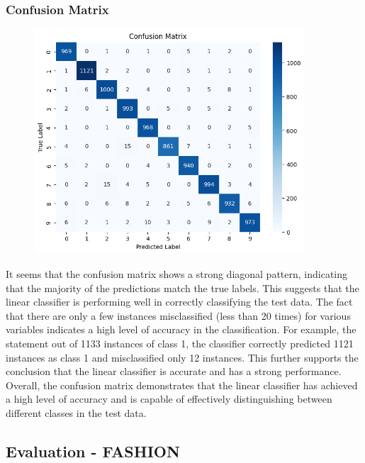 \documentclass{midl} %
\begin{document}
\subsubsection{Confusion Matrix}
\begin{figure}
\centering
\includegraphics[width=0.9\textwidth]{confusion_matrix_mnist.png}\hfill
\end{figure}
It seems that the confusion matrix shows a strong diagonal pattern, indicating that the majority of the predictions match the true labels. This suggests that the linear classifier is performing well in correctly classifying the test data. The fact that there are only a few instances misclassified (less than 20 times) for various variables indicates a high level of accuracy in the classification.
For example, the statement out of 1133 instances of class 1, the classifier correctly predicted 1121 instances as class 1 and misclassified only 12 instances. This further supports the conclusion that the linear classifier is accurate and has a strong performance.
Overall, the confusion matrix demonstrates that the linear classifier has achieved a high level of accuracy and is capable of effectively distinguishing between different classes in the test data.






\subsection{Evaluation - FASHION}
\end{document}
